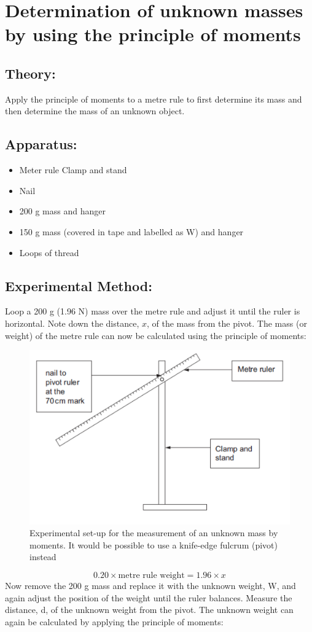 \section{Determination of unknown masses by using the principle of moments}
\subsection{Theory:}  
Apply the principle of moments to a metre rule to first determine its mass and then determine the mass of an unknown object.   
\subsection{Apparatus:} 
\begin{itemize}
\item Meter rule Clamp and stand 
\item Nail 
\item 200 g mass and hanger 
\item 150 g mass (covered in tape and labelled as W) and hanger 
\item Loops of thread           
\end{itemize}
\subsection {Experimental Method:}  
Loop a 200 g (1.96 N) mass over the metre rule and adjust it until the ruler is horizontal. Note down the distance, $x$, of the mass from the pivot. The mass (or weight) of the metre rule can now be calculated using the principle of moments:  
\begin{figure}
\includegraphics[width=\textwidth]{moments.PNG}
\caption{Experimental set-up for the measurement of an unknown mass by moments. It would be possible to use a knife-edge fulcrum (pivot) instead}
\end{figure}
\[0.20 \times \text{metre rule weight} = 1.96 \times x\] Now remove the 200 g mass and replace it with the unknown weight, W, and again adjust the position of the weight until the ruler balances. Measure the distance, d, of the unknown weight from the pivot. The unknown weight can again be calculated by applying the principle of moments: 

